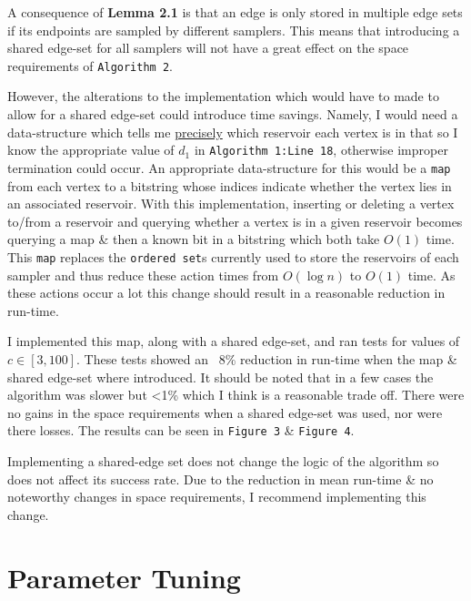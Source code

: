 \documentclass[11pt,twoside,a4paper]{report}
\begin{document}
\par A consequence of \textbf{Lemma 2.1} is that an edge is only stored in multiple edge sets if its endpoints are sampled by different samplers. %
This means that introducing a shared edge-set for all samplers will not have a great effect on the space requirements of \texttt{Algorithm 2}.
\par However, the alterations to the implementation which would have to made to allow for a shared edge-set could introduce time savings. Namely, I would need a data-structure which tells me \underline{precisely} which reservoir each vertex is in that so I know the appropriate value of $d_1$ in \texttt{Algorithm 1:Line 18}, otherwise improper termination could occur. An appropriate data-structure for this would be a \texttt{map} from each vertex to a bitstring whose indices indicate whether the vertex lies in an associated reservoir. With this implementation, inserting or deleting a vertex to/from a reservoir and querying whether a vertex is in a given reservoir becomes querying a map \& then a known bit in a bitstring which both take $O(1)$ time. This \texttt{map} replaces the \texttt{ordered set}s currently used to store the reservoirs of each sampler and thus reduce these action times from $O(\log n)$ to $O(1)$ time. As these actions occur a lot this change should result in a reasonable reduction in run-time. %

\par I implemented this map, along with a shared edge-set, %
and ran tests for values of $c\in[3,100]$. These tests showed an ~8\% reduction in run-time when the map \& shared edge-set where introduced. It should be noted that in a few cases the algorithm was slower but <1\% which I think is a reasonable trade off. %
There were no gains in the space requirements when a shared edge-set was used, nor were there losses. The results can be seen in \texttt{Figure 3} \& \texttt{Figure 4}.
\par Implementing a shared-edge set does not change the logic of the algorithm so does not affect its success rate. Due to the reduction in mean run-time \& no noteworthy changes in space requirements, I recommend implementing this change. %

\section{Parameter Tuning}
\end{document}
